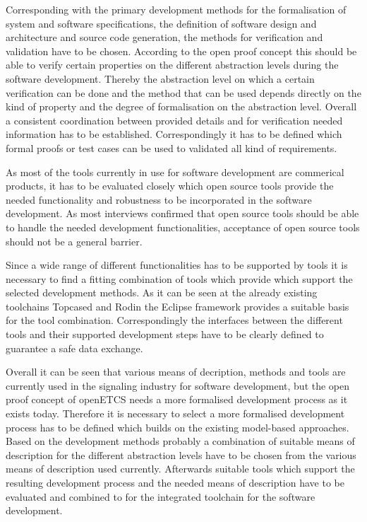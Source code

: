 \documentclass{./template/openetcs_report}
\begin{document}
Corresponding with the primary development methods for the formalisation of system and software specifications, the definition of software design and architecture and source code generation, the methods for verification and validation have to be chosen. According to the open proof concept this should be able to verify certain properties on the different abstraction levels during the software development. Thereby the abstraction level on which a certain verification can be done and the method that can be used depends directly on the kind of property and the degree of formalisation on the abstraction level. Overall a consistent coordination between provided details and for verification needed information has to be established. Correspondingly it has to be defined which formal proofs or test cases can be used to validated all kind of requirements.

As most of the tools currently in use for software development are commerical products, it has to be evaluated closely which open source tools provide the needed functionality and  robustness to be incorporated in the software development. As most interviews confirmed that open source tools should be able to handle the needed development functionalities, acceptance of open source tools should not be a general barrier. 

Since a wide range of different functionalities has to be supported by tools it is necessary to find a fitting combination of tools which provide which support the selected development methods. As it can be seen at the already existing toolchains Topcased and Rodin the Eclipse framework provides a suitable basis for the tool combination. Correspondingly the interfaces between the different tools and their supported development steps have to be clearly defined to guarantee a safe data exchange.

Overall it can be seen that various means of decription, methods and tools are currently used in the signaling industry for software development, but the open proof concept of openETCS needs a more formalised development process as it exists today. Therefore it is necessary to select a more formalised  development process has to be defined which builds on the existing model-based approaches. Based on the development methods probably a combination of suitable means of description for the different abstraction levels have to be chosen from the various means of description used currently. Afterwards suitable tools which support the resulting development process and the needed means of description have to be evaluated and combined to for the integrated toolchain for the software development.
\end{document}

